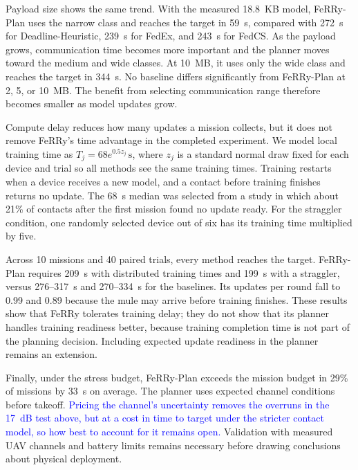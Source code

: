 \documentclass[conference]{IEEEtran}
\newcommand{\sysname}{FeRRy}
\begin{document}
Payload size shows the same trend. With the measured 18.8~KB model,
\sysname{}-Plan uses the narrow class and reaches the target in 59~s, compared
with 272~s for Deadline-Heuristic, 239~s for FedEx, and 243~s for FedCS.
As the payload grows, communication time becomes more important and the planner
moves toward the medium and wide classes. At 10~MB, it uses only the wide class
and reaches the target in 344~s. No baseline differs significantly from
\sysname{}-Plan at 2, 5, or 10~MB. The benefit from selecting communication
range therefore becomes smaller as model updates grow.

Compute delay reduces how many updates a mission collects, but it does not
remove \sysname{}'s time advantage in the completed experiment. We model local
training time as
\(T_j=68e^{0.5z_j}\,\mathrm{s}\), where \(z_j\) is a standard normal draw
fixed for each device and trial so all methods see the same training times.
Training restarts when a device receives a new model, and a contact before
training finishes returns no update. The 68~s median was selected from a study
in which about 21\% of contacts after the first mission found no update ready.
For the straggler condition, one randomly selected device out of six has its
training time multiplied by five.

Across 10 missions and 40 paired trials, every method reaches the target.
\sysname{}-Plan requires 209~s with distributed training times and 199~s with
a straggler, versus 276--317~s and 270--334~s for the baselines. Its updates
per round fall to 0.99 and 0.89 because the mule may arrive before training
finishes. These results show that \sysname{} tolerates training delay; they do
not show that its planner handles training readiness better, because training
completion time is not part of the planning decision. Including expected update
readiness in the planner remains an extension.

Finally, under the stress budget, \sysname{}-Plan exceeds the mission budget in
29\% of missions by 33~s on average. The planner uses expected channel
conditions before takeoff. \textcolor{blue}{Pricing the channel's uncertainty
removes the overruns in the 17~dB test above, but at a cost in time to target
under the stricter contact model, so how best to account for it remains open.}
Validation with measured UAV channels and battery limits remains necessary
before drawing conclusions about physical deployment.
\end{document}
